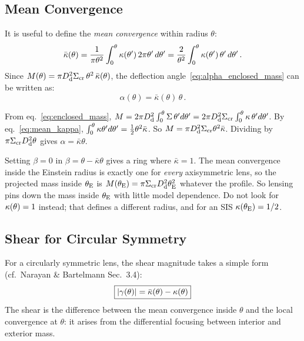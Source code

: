 \subsection{Mean Convergence}

It is useful to define the \emph{mean convergence} within radius
$\theta$:
\begin{equation}
    \bar{\kappa}(\theta) = \frac{1}{\pi\theta^2}
    \int_0^\theta \kappa(\theta')\, 2\pi\theta'\, d\theta'
    = \frac{2}{\theta^2} \int_0^\theta
    \kappa(\theta')\, \theta'\, d\theta' \,.
    \label{eq:mean_kappa}
\end{equation}
Since $M(\theta) = \pi D_{\mathrm{d}}^2 \Sigma_{\mathrm{cr}}\, \theta^2\, \bar{\kappa}(\theta)$,
the deflection angle~\eqref{eq:alpha_enclosed_mass} can be written as:
\begin{equation}
    \alpha(\theta) = \bar{\kappa}(\theta)\, \theta \,.
    \label{eq:alpha_mean_kappa}
\end{equation}

\begin{derivation}[$M = \pi\Dd^2\Sigmacr\theta^2\bar\kappa$]
From eq.~\eqref{eq:enclosed_mass},
$M = 2\pi D_{\mathrm{d}}^2\int_0^\theta\Sigma\,\theta'd\theta' = 2\pi D_{\mathrm{d}}^2\Sigma_{\mathrm{cr}}\int_0^\theta\kappa\,\theta'd\theta'$.
By eq.~\eqref{eq:mean_kappa}, $\int_0^\theta\kappa\theta'd\theta' = \tfrac{1}{2}\theta^2\bar\kappa$.
So $M = \pi\Dd^2\Sigmacr\theta^2\bar\kappa$.  Dividing by
$\pi\Sigma_{\mathrm{cr}}D_{\mathrm{d}}^2\theta$ gives $\alpha = \bar\kappa\theta$.
\end{derivation}

\begin{annotation}[$\bar\kappa(\thetaE) = 1$ defines $\thetaE$]
Setting $\beta = 0$ in $\beta = \theta-\bar\kappa\theta$ gives a ring where
$\bar\kappa = 1$.  The mean convergence inside the Einstein radius is exactly
one for \emph{every} axisymmetric lens, so the projected mass inside $\thetaE$
is $M(\theta_{\mathrm{E}}) = \pi\Sigma_{\mathrm{cr}}D_{\mathrm{d}}^2\theta_{\mathrm{E}}^2$ whatever the profile.  So lensing
pins down the mass inside $\thetaE$ with little model dependence.  Do not
look for $\kappa(\theta) = 1$ instead; that defines a different radius,
and for an SIS $\kappa(\theta_{\mathrm{E}}) = 1/2$.
\end{annotation}

\subsection{Shear for Circular Symmetry}

For a circularly symmetric lens, the shear magnitude takes a simple
form (cf.\ Narayan \& Bartelmann Sec.~3.4):
\begin{equation}
    \boxed{
    |\gamma(\theta)| = \bar{\kappa}(\theta) - \kappa(\theta)
    }
    \label{eq:gamma_circular}
\end{equation}
The shear is the difference between the mean convergence inside
$\theta$ and the local convergence at $\theta$: it arises from the
differential focusing between interior and exterior mass.

